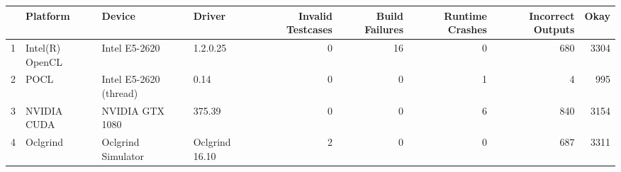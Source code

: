 \begin{tabular}{llllrrrrr}
\toprule
{} &         Platform &                  Device &          Driver &  Invalid Testcases &  Build Failures &  Runtime Crashes &  Incorrect Outputs &  Okay \\
\midrule
1 &  Intel(R) OpenCL &           Intel E5-2620 &        1.2.0.25 &                  0 &              16 &                0 &                680 &  3304 \\
2 &             POCL &  Intel E5-2620 (thread) &            0.14 &                  0 &               0 &                1 &                  4 &   995 \\
3 &      NVIDIA CUDA &         NVIDIA GTX 1080 &          375.39 &                  0 &               0 &                6 &                840 &  3154 \\
4 &         Oclgrind &      Oclgrind Simulator &  Oclgrind 16.10 &                  2 &               0 &                0 &                687 &  3311 \\
\bottomrule
\end{tabular}
